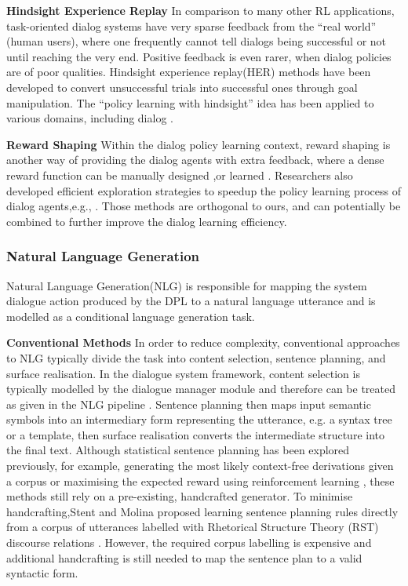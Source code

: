 \documentclass[10pt,twocolumn,letterpaper]{article}
\begin{document}
\textbf{Hindsight Experience Replay} In comparison to many other RL applications, task-oriented dialog systems have very sparse feedback from the “real world” (human users), where one frequently cannot tell dialogs being successful or not until reaching the very end. Positive feedback is even rarer, when dialog policies are of poor qualities. Hindsight experience  replay(HER) \cite{andrychowicz2017hindsight} methods have been developed to convert unsuccessful trials into successful ones through goal manipulation. The “policy learning with hindsight” idea has been applied  to  various  domains,  including  dialog \cite{lu2019goal} .  

\textbf{Reward Shaping} Within  the  dialog  policy  learning  context,  reward shaping is another way of providing the dialog agents with extra feedback, where a dense reward function can be manually designed \cite{su2015reward},or learned \cite{su2016line}.  Researchers also developed  efficient  exploration  strategies  to  speedup the policy learning process of dialog agents,e.g., \cite{pietquin2011sample,lagoudakis2003least}. Those methods are orthogonal to ours, and can  potentially  be  combined  to  further  improve the dialog learning efficiency.

\subsubsection{Natural Language Generation}
Natural Language Generation(NLG)  is  responsible for mapping the system dialogue action produced by the DPL to a natural language utterance and is modelled as a conditional language generation task.

\textbf{Conventional Methods} In order to reduce complexity, conventional approaches to NLG typically divide the task into content selection, sentence planning, and surface realisation. In the dialogue system framework, content selection is typically modelled by the dialogue manager module and therefore can be treated as given in the NLG pipeline \cite{gavsic2013gaussian,young2013pomdp}. Sentence planning then maps input semantic symbols into an intermediary form representing the utterance, e.g. a syntax tree or a template, then surface realisation converts the intermediate structure into the final text\cite{walker2002training}. Although statistical sentence planning has been explored previously, for example, generating the most likely context-free derivations given a corpus\cite{belz2008automatic} or maximising the expected reward using reinforcement learning \cite{rieser2009natural}, these methods still rely on a pre-existing, handcrafted generator. To minimise handcrafting,Stent and Molina \cite{stent2009evaluating}proposed learning sentence planning rules directly from a corpus of utterances labelled with Rhetorical Structure Theory (RST) discourse relations \cite{mann1988rhetorical}. However, the required corpus labelling is expensive and additional handcrafting is still needed to map the sentence plan to a valid syntactic form.
\end{document}
